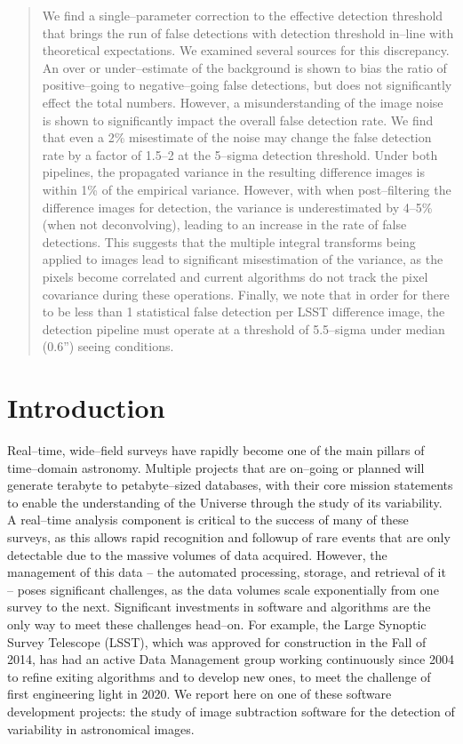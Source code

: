 \documentclass[iop]{emulateapj}
\begin{document}
\begin{abstract}
We find a single--parameter correction to the effective detection threshold that brings the run of false detections with detection threshold in--line with theoretical expectations.
We examined several sources for this discrepancy.
An over or under--estimate of the background is shown to bias the ratio of positive--going to negative--going false detections, but does not significantly effect the total numbers.
However, a misunderstanding of the image noise is shown to significantly impact the overall false detection rate.
We find that even a 2\% misestimate of the noise may change the false detection rate by a factor of 1.5--2 at the 5--sigma detection threshold.
Under both pipelines, the propagated variance in the resulting difference images is within 1\% of the empirical variance.
However, with when post--filtering the difference images for detection, the variance is underestimated by 4--5\% (when not deconvolving), leading to an increase in the rate of false detections.
This suggests that the multiple integral transforms being applied to images lead to significant misestimation of the variance, as the pixels become correlated and current algorithms do not track the pixel covariance during these operations.
Finally, we note that in order for there to be less than 1 statistical false detection per LSST difference image, the detection pipeline must operate at a threshold of 5.5--sigma under median (0.6'') seeing conditions.

\end{abstract}

\section{Introduction}

Real--time, wide--field surveys have rapidly become one of the main pillars of time--domain astronomy.
Multiple projects that are on--going or planned will generate terabyte to petabyte--sized databases, with their core mission statements to enable the understanding of the Universe through the study of its variability.
A real--time analysis component is critical to the success of many of these surveys, as this allows rapid recognition and followup of rare events that are only detectable due to the massive volumes of data acquired.
However, the management of this data -- the automated processing, storage, and retrieval of it -- poses significant challenges, as the data volumes scale exponentially from one survey to the next.
Significant investments in software and algorithms are the only way to meet these challenges head--on.
For example, the Large Synoptic Survey Telescope (LSST), which was approved for construction in the Fall of 2014, has had an active Data Management group working continuously since 2004 to refine exiting algorithms and to develop new ones, to meet the challenge of first engineering light in 2020.
We report here on one of these software development projects: the study of image subtraction software for the detection of variability in astronomical images.
\end{document}
